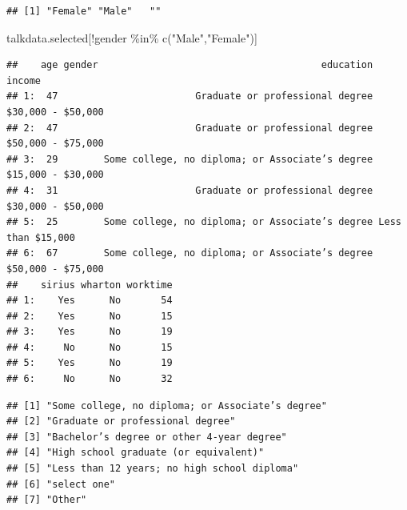 \documentclass[
  12pt,
]{article}
\newenvironment{Shaded}{\begin{snugshade}}{\end{snugshade}}
\newcommand{\CommentTok}[1]{\textcolor[rgb]{0.56,0.35,0.01}{\textit{#1}}}
\newcommand{\DocumentationTok}[1]{\textcolor[rgb]{0.56,0.35,0.01}{\textbf{\textit{#1}}}}
\newcommand{\FunctionTok}[1]{\textcolor[rgb]{0.00,0.00,0.00}{#1}}
\newcommand{\NormalTok}[1]{#1}
\newcommand{\OtherTok}[1]{\textcolor[rgb]{0.56,0.35,0.01}{#1}}
\newcommand{\SpecialCharTok}[1]{\textcolor[rgb]{0.00,0.00,0.00}{#1}}
\newcommand{\StringTok}[1]{\textcolor[rgb]{0.31,0.60,0.02}{#1}}
\begin{document}
\begin{verbatim}
## [1] "Female" "Male"   ""
\end{verbatim}

\begin{Shaded}
\begin{Highlighting}[]
\NormalTok{talkdata.selected[}\SpecialCharTok{!}\NormalTok{gender }\SpecialCharTok{\%in\%} \FunctionTok{c}\NormalTok{(}\StringTok{"Male"}\NormalTok{,}\StringTok{"Female"}\NormalTok{)]}
\end{Highlighting}
\end{Shaded}

\begin{verbatim}
##    age gender                                       education            income
## 1:  47                        Graduate or professional degree $30,000 - $50,000
## 2:  47                        Graduate or professional degree $50,000 - $75,000
## 3:  29        Some college, no diploma; or Associate’s degree $15,000 - $30,000
## 4:  31                        Graduate or professional degree $30,000 - $50,000
## 5:  25        Some college, no diploma; or Associate’s degree Less than $15,000
## 6:  67        Some college, no diploma; or Associate’s degree $50,000 - $75,000
##    sirius wharton worktime
## 1:    Yes      No       54
## 2:    Yes      No       15
## 3:    Yes      No       19
## 4:     No      No       15
## 5:    Yes      No       19
## 6:     No      No       32
\end{verbatim}

\begin{Shaded}
\end{Shaded}

\begin{verbatim}
## [1] "Some college, no diploma; or Associate’s degree"
## [2] "Graduate or professional degree"                
## [3] "Bachelor’s degree or other 4-year degree"       
## [4] "High school graduate (or equivalent)"           
## [5] "Less than 12 years; no high school diploma"     
## [6] "select one"                                     
## [7] "Other"
\end{verbatim}
\end{document}
